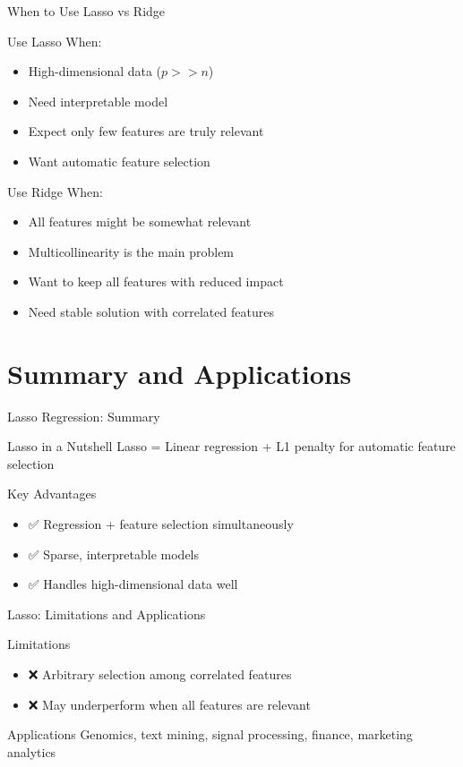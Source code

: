 \documentclass{beamer}
\begin{document}
\begin{frame}{When to Use Lasso vs Ridge}
\begin{keypointsbox}{Use Lasso When:}
\begin{itemize}
\item High-dimensional data ($p >> n$)
\item Need interpretable model
\item Expect only few features are truly relevant
\item Want automatic feature selection
\end{itemize}
\end{keypointsbox}
\pause

\begin{keypointsbox}{Use Ridge When:}
\begin{itemize}
\item All features might be somewhat relevant
\item Multicollinearity is the main problem
\item Want to keep all features with reduced impact
\item Need stable solution with correlated features
\end{itemize}
\end{keypointsbox}
\end{frame}

\section{Summary and Applications}

\begin{frame}{Lasso Regression: Summary}
\begin{definitionbox}{Lasso in a Nutshell}
Lasso = Linear regression + L1 penalty for automatic feature selection
\end{definitionbox}

\begin{keypointsbox}{Key Advantages}
{\small
\begin{itemize}
\item ✅ Regression + feature selection simultaneously
\item ✅ Sparse, interpretable models
\item ✅ Handles high-dimensional data well
\end{itemize}
}
\end{keypointsbox}
\end{frame}

\begin{frame}{Lasso: Limitations and Applications}
\begin{keypointsbox}{Limitations}
{\small
\begin{itemize}
\item ❌ Arbitrary selection among correlated features
\item ❌ May underperform when all features are relevant
\end{itemize}
}
\end{keypointsbox}

\begin{examplebox}{Applications}
Genomics, text mining, signal processing, finance, marketing analytics
\end{examplebox}
\end{frame}
\end{document}
